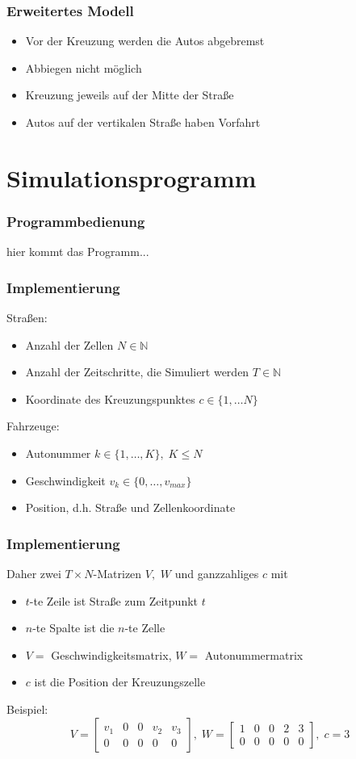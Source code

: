 \documentclass[hyperref={pdfpagelabels=false}, 12pt]{beamer}
\begin{document}
{\begin{frame}
\end{frame}

\begin{frame}
	\frametitle{Erweitertes Modell }
	\begin{itemize}
		\item Vor der Kreuzung werden die Autos abgebremst
		\item Abbiegen nicht möglich
		\item Kreuzung jeweils auf der Mitte der Straße
		\item Autos auf der vertikalen Straße haben Vorfahrt
	\end{itemize}
\end{frame}

\section{Simulationsprogramm}
\begin{frame}
	\frametitle{Programmbedienung}
	hier kommt das Programm...
\end{frame}

\begin{frame}
	\frametitle{Implementierung}
Straßen:
\begin{itemize}
  \item Anzahl der Zellen \(N \in \mathbb{N}\)
  \item Anzahl der Zeitschritte, die Simuliert werden \(T \in \mathbb{N}\)
  \item Koordinate des Kreuzungspunktes \(c \in \{ 1, \ldots N \}\)
\end{itemize}
Fahrzeuge:
\begin{itemize}
  \item Autonummer \(k \in \{ 1, \ldots, K \}, \; K \leq N\) 
  \item Geschwindigkeit \(v_k \in \{0, \ldots, v_{max} \}\)
  \item Position, d.h. Straße und Zellenkoordinate
\end{itemize}
\end{frame}

\begin{frame}
	\frametitle{Implementierung}
	Daher zwei $T\times N$-Matrizen $V,$ $W$ und ganzzahliges $c$ mit 
	\begin{itemize}
		\item $t$-te Zeile ist Straße zum Zeitpunkt $t$
		\item $n$-te Spalte ist die $n$-te Zelle 
		\item $V=$ Geschwindigkeitsmatrix, $W=$ Autonummermatrix
		\item $c$ ist die Position der Kreuzungszelle
	\end{itemize}
	Beispiel: 
	\[
  V = 
  \begin{bmatrix}
    v_1& 0& 0& v_2& v_3 \\
    0& 0& 0& 0& 0
  \end{bmatrix}, \;
  W = 
  \begin{bmatrix}
    1& 0& 0& 2& 3 \\
    0& 0& 0& 0& 0
  \end{bmatrix}, \;
  c = 3
\]
	

\end{frame}}
\end{document}
